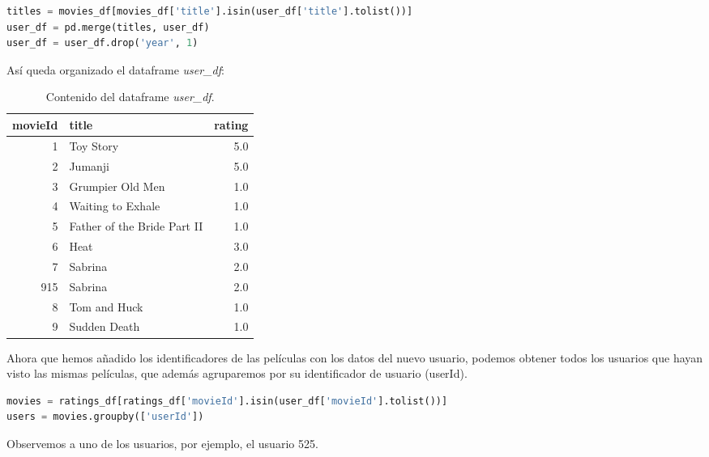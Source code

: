 \documentclass{uimppracticas}
\begin{document}
\begin{lstlisting}[language=python, basicstyle=\small]
titles = movies_df[movies_df['title'].isin(user_df['title'].tolist())]
user_df = pd.merge(titles, user_df)
user_df = user_df.drop('year', 1)
\end{lstlisting}

Así queda organizado el dataframe \textit{user\_df}:

\begin{table}[H]
	\centering
	\begin{tabular}{rlr}
		\toprule
		movieId &                  title &  rating \\
		\midrule
		1 &                    Toy Story &     5.0 \\
		2 &                      Jumanji &     5.0 \\
		3 &             Grumpier Old Men &     1.0 \\
		4 &            Waiting to Exhale &     1.0 \\
		5 &  Father of the Bride Part II &     1.0 \\
		6 &                         Heat &     3.0 \\
		7 &                      Sabrina &     2.0 \\
		915 &                      Sabrina &     2.0 \\
		8 &                 Tom and Huck &     1.0 \\
		9 &                 Sudden Death &     1.0 \\
		\bottomrule
	\end{tabular}
	\caption{Contenido del dataframe \textit{user\_df}.}
	\label{user_df}
\end{table}

Ahora que hemos añadido los identificadores de las películas con los datos del nuevo usuario, podemos obtener todos los usuarios que hayan visto las mismas películas, que además agruparemos por su identificador de usuario (userId).

\begin{lstlisting}[language=python, basicstyle=\small]
movies = ratings_df[ratings_df['movieId'].isin(user_df['movieId'].tolist())]
users = movies.groupby(['userId'])
\end{lstlisting}

Observemos a uno de los usuarios, por ejemplo, el usuario 525.
\end{document}
